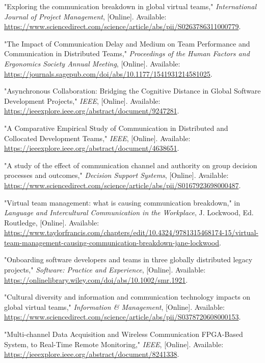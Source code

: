 \documentclass[12pt]{article}
\begin{document}
\begin{thebibliography}{9}
"Exploring the communication breakdown in global virtual teams," \emph{International Journal of Project Management}, [Online]. Available: \url{https://www.sciencedirect.com/science/article/abs/pii/S0263786311000779}.

"The Impact of Communication Delay and Medium on Team Performance and Communication in Distributed Teams," \emph{Proceedings of the Human Factors and Ergonomics Society Annual Meeting}, [Online]. Available: \url{https://journals.sagepub.com/doi/abs/10.1177/1541931214581025}.

"Asynchronous Collaboration: Bridging the Cognitive Distance in Global Software Development Projects," \emph{IEEE}, [Online]. Available: \url{https://ieeexplore.ieee.org/abstract/document/9247281}.

"A Comparative Empirical Study of Communication in Distributed and Collocated Development Teams," \emph{IEEE}, [Online]. Available: \url{https://ieeexplore.ieee.org/abstract/document/4638651}.

"A study of the effect of communication channel and authority on group decision processes and outcomes," \emph{Decision Support Systems}, [Online]. Available: \url{https://www.sciencedirect.com/science/article/abs/pii/S0167923698000487}.

"Virtual team management: what is causing communication breakdown," in \emph{Language and Intercultural Communication in the Workplace}, J. Lockwood, Ed. Routledge, [Online]. Available: \url{https://www.taylorfrancis.com/chapters/edit/10.4324/9781315468174-15/virtual-team-management-causing-communication-breakdown-jane-lockwood}.

"Onboarding software developers and teams in three globally distributed legacy projects," \emph{Software: Practice and Experience}, [Online]. Available: \url{https://onlinelibrary.wiley.com/doi/abs/10.1002/smr.1921}.

"Cultural diversity and information and communication technology impacts on global virtual teams," \emph{Information \& Management}, [Online]. Available: \url{https://www.sciencedirect.com/science/article/abs/pii/S0378720608000153}.

"Multi-channel Data Acquisition and Wireless Communication FPGA-Based System, to Real-Time Remote Monitoring," \emph{IEEE}, [Online]. Available: \url{https://ieeexplore.ieee.org/abstract/document/8241338}.
\end{thebibliography}
\end{document}
